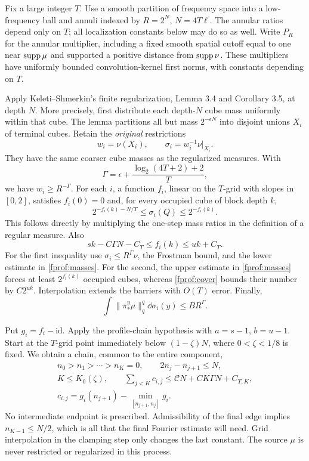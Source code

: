 Fix a large integer \(T\). Use a smooth partition of frequency space into a low-frequency ball and annuli indexed by \(R=2^N\), \(N=4T\ell\). The annular ratios depend only on \(T\); all localization constants below may do so as well. Write \(P_R\) for the annular multiplier, including a fixed smooth spatial cutoff equal to one near \(\operatorname{supp}\mu\) and supported a positive distance from \(\operatorname{supp}\nu\). These multipliers have uniformly bounded convolution-kernel first norms, with constants depending on \(T\).

Apply Keleti--Shmerkin's finite regularization, Lemma 3.4 and Corollary 3.5, at depth \(N\). More precisely, first distribute each depth-\(N\) cube mass uniformly within that cube. The lemma partitions all but mass \(2^{-\epsilon N}\) into disjoint unions \(X_i\) of terminal cubes. Retain the \emph{original} restrictions
$$
 w_i=\nu(X_i),\qquad \sigma_i=w_i^{-1}\nu|_{X_i}.
$$
They have the same coarser cube masses as the regularized measures. With
$$
 \Gamma=\epsilon+\frac{\log_2(4T+2)+2}{T},
$$
we have \(w_i\geq R^{-\Gamma}\). For each \(i\), a function \(f_i\), linear on the \(T\)-grid with slopes in \([0,2]\), satisfies \(f_i(0)=0\) and, for every occupied cube of block depth \(k\),
\begin{equation}\label{fprof:masses}
 2^{-f_i(k)-N/T}\leq\sigma_i(Q)\leq2^{-f_i(k)}.
\end{equation}
This follows directly by multiplying the one-step mass ratios in the definition of a regular measure. Also
\begin{equation}\label{fprof:barriers}
 sk-C\Gamma N-C_T\leq f_i(k)\leq uk+C_T.
\end{equation}
For the first inequality use \(\sigma_i\leq R^\Gamma\nu\), the Frostman bound, and the lower estimate in \eqref{fprof:masses}. For the second, the upper estimate in \eqref{fprof:masses} forces at least \(2^{f_i(k)}\) occupied cubes, whereas \eqref{fprof:cover} bounds their number by \(C2^{uk}\). Interpolation extends the barriers with \(O(T)\) error. Finally,
\begin{equation}\label{fprof:radialcomponent}
 \int\|\pi^y_*\mu\|_q^q\dd\sigma_i(y)\leq B R^\Gamma.
\end{equation}

Put \(g_i=f_i-\mathrm{id}\). Apply the profile-chain hypothesis with
\(a=s-1\), \(b=u-1\). Start at the \(T\)-grid point immediately
below \((1-\zeta)N\), where \(0<\zeta<1/8\) is fixed.
We obtain a chain, common to the entire component,
\begin{gather}\label{fprof:levels}
 n_0>n_1>\cdots>n_K=0,\qquad 2n_j-n_{j+1}\le N,\\
 K\le K_0(\zeta),\qquad
 \sum_{j<K}c_{i,j}\le \mathcal CN+C K\Gamma N+C_{T,K},\label{fprof:sumcost}\\
 c_{i,j}=g_i(n_{j+1})-\min_{[n_{j+1},n_j]}g_i.\nonumber
\end{gather}
No intermediate endpoint is prescribed. Admissibility of the final edge implies
\(n_{K-1}\le N/2\), which is all that the final Fourier estimate will need.
Grid interpolation in the clamping step only changes the last constant. The source \(\mu\) is never restricted or regularized in this process.

